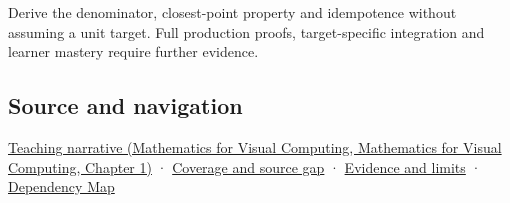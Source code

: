 Derive the denominator, closest-point property and idempotence without assuming a unit target. Full production proofs, target-specific integration and learner mastery require further evidence.

\subsection{Source and navigation}\label{appendix-505a502c372a-source-and-navigation}

\href{../02-Mathematics-for-Visual-Computing/main.pdf\#nameddest=01-foundations-i-ch017-projection-separates-useful-movement-from-sideways-movement}{Teaching narrative (Mathematics for Visual Computing, Mathematics for Visual Computing, Chapter 1)} · \hyperref[appendix-fd090d982a15-phase-6---parts-501-600]{Coverage and source gap} · \hyperref[appendix-a103e7846d21-phase-6---source-analysis-and-verification]{Evidence and limits} · \hyperref[appendix-4ad47bdd269a]{Dependency Map}

